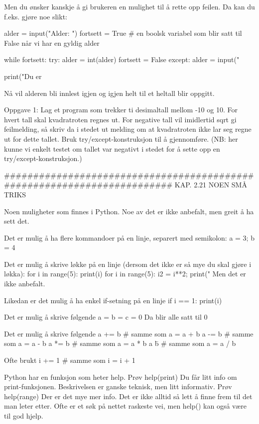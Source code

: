 {Men du ønsker kanskje å gi brukeren en mulighet til å rette opp feilen.
Da kan du f.eks. gjøre noe slikt:

alder = input("Alder: ")
fortsett = True     # en boolsk variabel som blir satt til False når vi har en gyldig alder

while fortsett: 
    try:
        alder = int(alder)
        fortsett = False
    except:
        alder = input("%

print("Du er %

Nå vil alderen bli innlest igjen og igjen helt til et heltall blir oppgitt. 


Oppgave 1: Lag et program som trekker ti desimaltall mellom -10 og 10.
For hvert tall skal kvadratroten regnes ut.
For negative tall vil imidlertid sqrt gi feilmelding, 
så skriv da i stedet ut melding om at kvadratroten ikke lar seg regne ut for dette tallet. 
Bruk try/except-konstruksjon til å gjennomføre.
(NB: her kunne vi enkelt testet om tallet var negativt i stedet for å sette opp en try/except-konstruksjon.) 

######################################################################## 
KAP. 2.21  NOEN SMÅ TRIKS

Noen muligheter som finnes i Python. 
Noe av det er ikke anbefalt, men greit å ha sett det. 


Det er mulig å ha flere kommandoer på en linje, separert med semikolon:
a = 3; b = 4


Det er mulig å skrive løkke på en linje 
(dersom det ikke er så mye du skal gjøre i løkka):
for i in range(5): print(i)
for i in range(5): i2 = i**2; print("%
Men det er ikke anbefalt. 

Likedan er det mulig å ha enkel if-setning på en linje 
if i == 1: print(i)


Det er mulig å skrive følgende
a = b = c = 0
Da blir alle satt til 0


Det er mulig å skrive følgende
a += b    # samme som a = a + b
a -= b    # samme som a = a - b
a *= b    # samme som a = a * b
a \= b    # samme som a = a / b

Ofte brukt 
i += 1    # samme som i = i + 1



Python har en funksjon som heter help.
Prøv
help(print)
Du får litt info om print-funksjonen.
Beskrivelsen er ganske teknisk, men litt informativ.
Prøv
help(range)
Der er det mye mer info. 
Det er ikke alltid så lett å finne frem til det man leter etter.
Ofte er et søk på nettet raskeste vei, men help() kan også være til god hjelp. 

}
